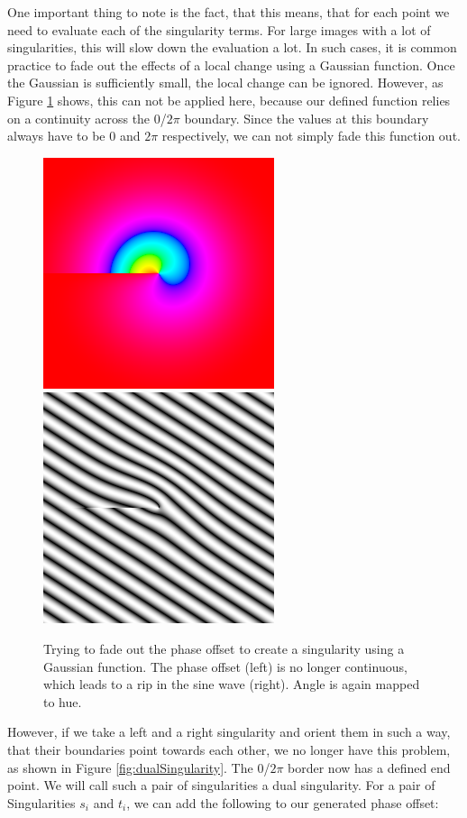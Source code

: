 \documentclass{utue} %
\begin{document}
One important thing to note is the fact, that this means, that for each point we need to evaluate each of the singularity terms. For large images with a lot of singularities, this will slow down the evaluation a lot. In such cases, it is common practice to fade out the effects of a local change using a Gaussian function. Once the Gaussian is sufficiently small, the local change can be ignored. However, as Figure \ref{fig:fadedSingularity} shows, this can not be applied here, because our defined function relies on a continuity across the $0$/$2\pi$ boundary. Since the values at this boundary always have to be $0$ and $2\pi$ respectively, we can not simply fade this function out.
\begin{figure}[ht]
  \centering
  \includegraphics[width=0.49\linewidth]{images/fadedPhase}
  \includegraphics[width=0.49\linewidth]{images/fadedPhaseSineWave}
  \caption{Trying to fade out the phase offset to create a singularity using a Gaussian function. The phase offset (left) is no longer continuous, which leads to a rip in the sine wave (right). Angle is again mapped to hue.}\label{fig:fadedSingularity}
\end{figure}
However, if we take a left and a right singularity and orient them in such a way, that their boundaries point towards each other, we no longer have this problem, as shown in Figure \ref{fig:dualSingularity}. The $0$/$2\pi$ border now has a defined end point. We will call such a pair of singularities a dual singularity. For a pair of Singularities $s_i$ and $t_i$, we can add the following to our generated phase offset:
\end{document}
